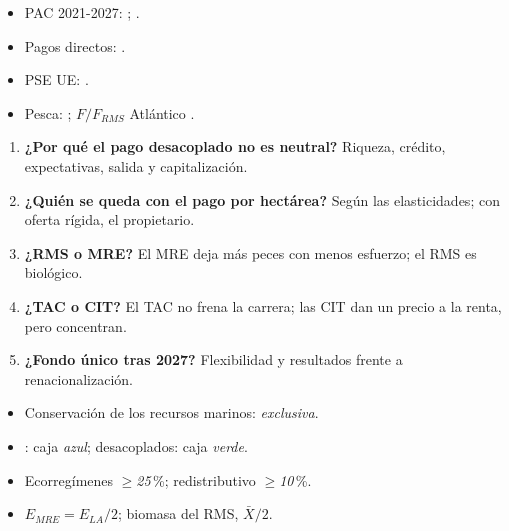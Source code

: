 \documentclass{article}
\begin{document}
\begin{columnas}
\anexorepaso
{}
\begin{itemize}
\item PAC 2021-2027: ; .
\item Pagos directos: .
\item PSE UE: .
\item Pesca: ; $F/F_{\mathit{RMS}}$ Atlántico .
\end{itemize}
\begin{enumerate}
\item \textbf{¿Por qué el pago desacoplado no es neutral?} Riqueza, crédito, expectativas, salida y capitalización.
\item \textbf{¿Quién se queda con el pago por hectárea?} Según las elasticidades; con oferta rígida, el propietario.
\item \textbf{¿RMS o MRE?} El MRE deja más peces con menos esfuerzo; el RMS es biológico.
\item \textbf{¿TAC o CIT?} El TAC no frena la carrera; las CIT dan un precio a la renta, pero concentran.
\item \textbf{¿Fondo único tras 2027?} Flexibilidad y resultados frente a renacionalización.
\end{enumerate}
\begin{trampa}
\begin{itemize}
\item Conservación de los recursos marinos: \emph{exclusiva}.
\item {}: caja \emph{azul}; desacoplados: caja \emph{verde}.
\item Ecorregímenes $\geq$\emph{25}\,\%; redistributivo $\geq$\emph{10}\,\%.
\item $E_{\mathit{MRE}}=E_{\mathit{LA}}/2$; biomasa del RMS, $\bar X/2$.
\end{itemize}
\end{trampa}

\end{columnas}
\end{document}
